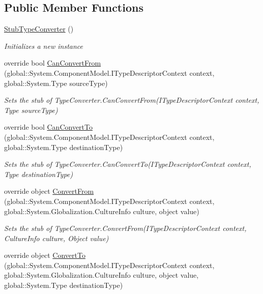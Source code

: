 \subsection*{Public Member Functions}
\begin{DoxyCompactItemize}
\item 
\hyperlink{class_system_1_1_component_model_1_1_fakes_1_1_stub_type_converter_aa7ec85240dc55096686317d1b45ae207}{Stub\-Type\-Converter} ()
\begin{DoxyCompactList}\small\item\em Initializes a new instance\end{DoxyCompactList}\item 
override bool \hyperlink{class_system_1_1_component_model_1_1_fakes_1_1_stub_type_converter_a4190e21a7f3ba0abe8df6846e99c2765}{Can\-Convert\-From} (global\-::\-System.\-Component\-Model.\-I\-Type\-Descriptor\-Context context, global\-::\-System.\-Type source\-Type)
\begin{DoxyCompactList}\small\item\em Sets the stub of Type\-Converter.\-Can\-Convert\-From(\-I\-Type\-Descriptor\-Context context, Type source\-Type)\end{DoxyCompactList}\item 
override bool \hyperlink{class_system_1_1_component_model_1_1_fakes_1_1_stub_type_converter_a3dae43495a5f23d2e50c999f2b68d40c}{Can\-Convert\-To} (global\-::\-System.\-Component\-Model.\-I\-Type\-Descriptor\-Context context, global\-::\-System.\-Type destination\-Type)
\begin{DoxyCompactList}\small\item\em Sets the stub of Type\-Converter.\-Can\-Convert\-To(\-I\-Type\-Descriptor\-Context context, Type destination\-Type)\end{DoxyCompactList}\item 
override object \hyperlink{class_system_1_1_component_model_1_1_fakes_1_1_stub_type_converter_ab6dd65133066fed08f5dcf71f5df8aa3}{Convert\-From} (global\-::\-System.\-Component\-Model.\-I\-Type\-Descriptor\-Context context, global\-::\-System.\-Globalization.\-Culture\-Info culture, object value)
\begin{DoxyCompactList}\small\item\em Sets the stub of Type\-Converter.\-Convert\-From(\-I\-Type\-Descriptor\-Context context, Culture\-Info culture, Object value)\end{DoxyCompactList}\item 
override object \hyperlink{class_system_1_1_component_model_1_1_fakes_1_1_stub_type_converter_a4dc578e4fcce4728e728035150637bba}{Convert\-To} (global\-::\-System.\-Component\-Model.\-I\-Type\-Descriptor\-Context context, global\-::\-System.\-Globalization.\-Culture\-Info culture, object value, global\-::\-System.\-Type destination\-Type)

\end{DoxyCompactItemize}
